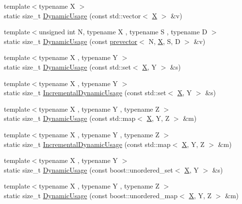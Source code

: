 \begin{DoxyCompactItemize}
\item 
{\footnotesize template$<$typename X $>$ }\\static size\+\_\+t \mbox{\hyperlink{namespacememusage_a1a75fc98190774a5cfa16fc700275660}{Dynamic\+Usage}} (const std\+::vector$<$ \mbox{\hyperlink{net_8cpp_a826edd40636cbaa44266b97c8c6a4fa3}{X}} $>$ \&v)
\item 
{\footnotesize template$<$unsigned int N, typename X , typename S , typename D $>$ }\\static size\+\_\+t \mbox{\hyperlink{namespacememusage_af74ab663a1abdcb9fe3df1f3bbfe02ff}{Dynamic\+Usage}} (const \mbox{\hyperlink{classprevector}{prevector}}$<$ N, \mbox{\hyperlink{net_8cpp_a826edd40636cbaa44266b97c8c6a4fa3}{X}}, S, D $>$ \&v)
\item 
{\footnotesize template$<$typename X , typename Y $>$ }\\static size\+\_\+t \mbox{\hyperlink{namespacememusage_a3835f97197741f8d3fbc9aa59f96f288}{Dynamic\+Usage}} (const std\+::set$<$ \mbox{\hyperlink{net_8cpp_a826edd40636cbaa44266b97c8c6a4fa3}{X}}, Y $>$ \&s)
\item 
{\footnotesize template$<$typename X , typename Y $>$ }\\static size\+\_\+t \mbox{\hyperlink{namespacememusage_adb94a858deacb691d493a604f572a9a9}{Incremental\+Dynamic\+Usage}} (const std\+::set$<$ \mbox{\hyperlink{net_8cpp_a826edd40636cbaa44266b97c8c6a4fa3}{X}}, Y $>$ \&s)
\item 
{\footnotesize template$<$typename X , typename Y , typename Z $>$ }\\static size\+\_\+t \mbox{\hyperlink{namespacememusage_a345c786f94a5f4d423ba6240273a804f}{Dynamic\+Usage}} (const std\+::map$<$ \mbox{\hyperlink{net_8cpp_a826edd40636cbaa44266b97c8c6a4fa3}{X}}, Y, Z $>$ \&m)
\item 
{\footnotesize template$<$typename X , typename Y , typename Z $>$ }\\static size\+\_\+t \mbox{\hyperlink{namespacememusage_ac3378c097b343ce1539a862fa273b8da}{Incremental\+Dynamic\+Usage}} (const std\+::map$<$ \mbox{\hyperlink{net_8cpp_a826edd40636cbaa44266b97c8c6a4fa3}{X}}, Y, Z $>$ \&m)
\item 
{\footnotesize template$<$typename X , typename Y $>$ }\\static size\+\_\+t \mbox{\hyperlink{namespacememusage_a6551a2eb5c7c55534efd8715da244e83}{Dynamic\+Usage}} (const boost\+::unordered\+\_\+set$<$ \mbox{\hyperlink{net_8cpp_a826edd40636cbaa44266b97c8c6a4fa3}{X}}, Y $>$ \&s)
\item 
{\footnotesize template$<$typename X , typename Y , typename Z $>$ }\\static size\+\_\+t \mbox{\hyperlink{namespacememusage_a6ad91da241c7c9802976b38e60091967}{Dynamic\+Usage}} (const boost\+::unordered\+\_\+map$<$ \mbox{\hyperlink{net_8cpp_a826edd40636cbaa44266b97c8c6a4fa3}{X}}, Y, Z $>$ \&m)
\end{DoxyCompactItemize}


